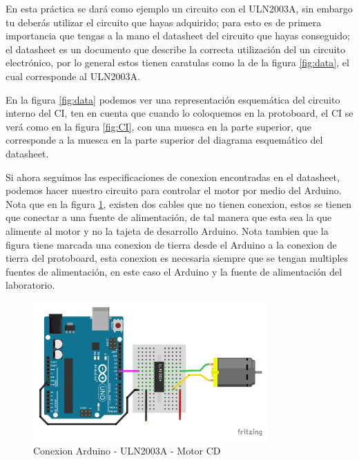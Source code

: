 		En esta práctica se dará como ejemplo un circuito con el ULN2003A, sin embargo tu deberás utilizar el circuito que hayas adquirido; para esto es de primera importancia que tengas a la mano el datasheet del circuito que hayas conseguido; el datasheet es un documento que describe la correcta utilización del un circuito electrónico, por lo general estos tienen caratulas como la de la figura \ref{fig:data}, el cual corresponde al ULN2003A.

		En la figura \ref{fig:data} podemos ver una representación esquemática del circuito interno del CI, ten en cuenta que cuando lo coloquemos en la protoboard, el CI se verá como en la figura \ref{fig:CI}, con una muesca en la parte superior, que corresponde a la muesca en la parte superior del diagrama esquemático del datasheet.

		Si ahora seguimos las especificaciones de conexion encontradas en el datasheet, podemos hacer nuestro circuito para controlar el motor por medio del Arduino. Nota que en la figura \ref{fig:motor_arduino}, existen dos cables que no tienen conexion, estos se tienen que conectar a una fuente de alimentación, de tal manera que esta sea la que alimente al motor y no la tajeta de desarrollo Arduino. Nota tambien que la figura tiene marcada una conexion de tierra desde el Arduino a la conexion de tierra del protoboard, esta conexion es necesaria siempre que se tengan multiples fuentes de alimentación, en este caso el Arduino y la fuente de alimentación del laboratorio.

		\begin{figure}
			\begin{center}
				\includegraphics[width=0.8\textwidth]{images/Arduino-ULN-CD.pdf}
				\caption{Conexion Arduino - ULN2003A - Motor CD}
				\label{fig:motor_arduino}
			\end{center}
		\end{figure}

